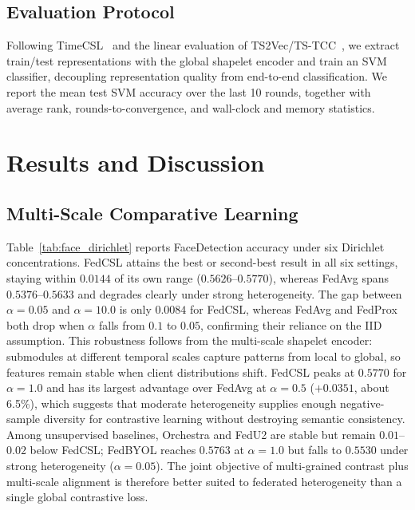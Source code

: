 \documentclass[sigconf]{acmart}
\begin{document}
\subsection{Evaluation Protocol}

Following TimeCSL~\cite{timescsl} and the linear evaluation of
TS2Vec/TS-TCC~\cite{ts2vec,tstcc}, we extract train/test representations with the
global shapelet encoder and train an SVM classifier, decoupling representation
quality from end-to-end classification. We report the mean test SVM accuracy over
the last 10 rounds, together with average rank, rounds-to-convergence, and
wall-clock and memory statistics.

\section{Results and Discussion}

\subsection{Multi-Scale Comparative Learning}

Table~\ref{tab:face_dirichlet} reports FaceDetection accuracy under six Dirichlet
concentrations. FedCSL attains the best or second-best result in all six
settings, staying within $0.0144$ of its own range ($0.5626$--$0.5770$), whereas
FedAvg spans $0.5376$--$0.5633$ and degrades clearly under strong heterogeneity.
The gap between $\alpha=0.05$ and $\alpha=10.0$ is only $0.0084$ for FedCSL,
whereas FedAvg and FedProx both drop when $\alpha$ falls from $0.1$ to $0.05$,
confirming their reliance on the IID assumption. This robustness follows from the
multi-scale shapelet encoder: submodules at different temporal scales capture
patterns from local to global, so features remain stable when client
distributions shift. FedCSL peaks at $0.5770$ for $\alpha=1.0$ and has its
largest advantage over FedAvg at $\alpha=0.5$ ($+0.0351$, about 6.5\%), which
suggests that moderate heterogeneity supplies enough negative-sample diversity
for contrastive learning without destroying semantic consistency. Among
unsupervised baselines, Orchestra and FedU2 are stable but remain $0.01$--$0.02$
below FedCSL; FedBYOL reaches $0.5763$ at $\alpha=1.0$ but falls to $0.5530$
under strong heterogeneity ($\alpha=0.05$). The joint objective of multi-grained
contrast plus multi-scale alignment is therefore better suited to federated
heterogeneity than a single global contrastive loss.
\end{document}
